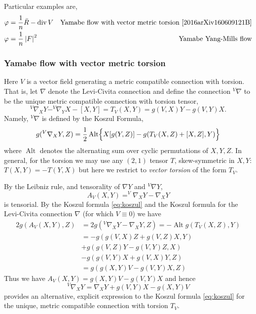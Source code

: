 \documentclass{amsart}
\begin{document}
Particular examples are,
\begin{align*}
\varphi &= \frac{1}{n} \bar{R} - \operatorname{div} V & \text{Yamabe flow with vector metric torsion \cite{2016arXiv160609121B}} \\
\varphi &= \frac{1}{n} \left|{F}\right|^2 & \text{Yamabe Yang-Mills flow}
\end{align*}

\subsubsection*{Yamabe flow with vector metric torsion}

Here \(V\) is a vector field generating a metric compatible connection with torsion. That is, let \(\nabla\) denote the Levi-Civita connection and define the connection \(^{V}\nabla\) to be the unique metric compatible connection with torsion tensor,
\begin{equation}
\label{eq:vector_torsion}
^{V}\nabla_X Y - ^{V}\nabla_Y X - [X, Y] = T_V(X, Y) = g(V, X) Y - g(V, Y) X.
\end{equation}
Namely, \(^{V}\nabla\) is defined by the Koszul Formula,
\begin{equation}
\label{eq:koszul}
g(^{V}\nabla_X Y, Z) = \frac{1}{2} \operatorname{Alt} \Bigl\{X[g(Y, Z)] - g(T_V(X, Z) + [X, Z], Y)\Bigr\}
\end{equation}
where $\operatorname{Alt}$ denotes the alternating sum over cyclic permutations of $X, Y, Z$. In general, for the torsion we may use any \((2, 1)\) tensor \(T\), skew-symmetric in \(X, Y\): \(T(X, Y) = -T(Y, X)\) but here we restrict to \emph{vector torsion} of the form \(T_V\).

By the Leibniz rule, and tensorality of \(\nabla Y\) and \(^{V}\nabla Y\),
\[
A_V(X, Y) = ^{V}\nabla_X Y - \nabla_X Y
\]
is tensorial. By the Koszul formula \eqref{eq:koszul} and the Koszul formula for the Levi-Civita connection \(\nabla\) (for which \(V \equiv 0\)) we have
\[
\begin{split}
2 g(A_V(X, Y), Z) &= 2 g(^{V}\nabla_X Y - \nabla_X Y, Z) = -\operatorname{Alt} g(T_V (X, Z), Y) \\
&= -g(g(V, X) Z + g(V, Z) X, Y) \\
&+ g(g(V, Z) Y - g(V, Y) Z, X) \\
&- g(g(V, Y) X + g(V, X) Y, Z) \\
&= g(g(X, Y)V - g(V, Y)X, Z)
\end{split}
\]
Thus we have $A_V(X, Y) = g(X, Y) V - g(V, Y) X$ and hence
\begin{equation}
\label{eq:vector_connection}
^{V}\nabla_X Y = \nabla_X Y + g(V, Y) X - g(X, Y) V
\end{equation}
provides an alternative, explicit expression to the Koszul formula \eqref{eq:koszul} for the unique, metric compatible connection with torsion \(T_V\).
\end{document}

